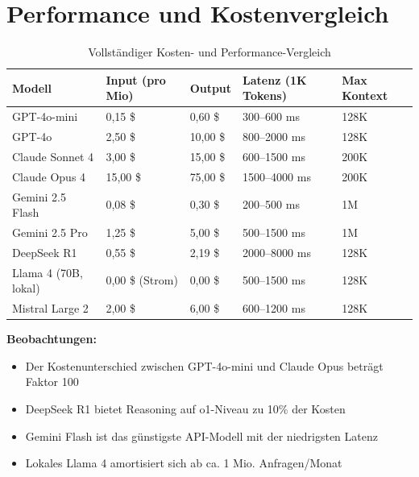 \section{Performance und Kostenvergleich}

\begin{table}[H]
\centering
\begin{tabularx}{\linewidth}{lXXXX}
\toprule
\textbf{Modell} & \textbf{Input (pro Mio)} & \textbf{Output} & \textbf{Latenz (1K Tokens)} & \textbf{Max Kontext} \\
\midrule
GPT-4o-mini & 0,15 \$ & 0,60 \$ & 300--600 ms & 128K \\
GPT-4o & 2,50 \$ & 10,00 \$ & 800--2000 ms & 128K \\
Claude Sonnet 4 & 3,00 \$ & 15,00 \$ & 600--1500 ms & 200K \\
Claude Opus 4 & 15,00 \$ & 75,00 \$ & 1500--4000 ms & 200K \\
Gemini 2.5 Flash & 0,08 \$ & 0,30 \$ & 200--500 ms & 1M \\
Gemini 2.5 Pro & 1,25 \$ & 5,00 \$ & 500--1500 ms & 1M \\
DeepSeek R1 & 0,55 \$ & 2,19 \$ & 2000--8000 ms & 128K \\
Llama 4 (70B, lokal) & 0,00 \$ (Strom) & 0,00 \$ & 500--1500 ms & 128K \\
Mistral Large 2 & 2,00 \$ & 6,00 \$ & 600--1200 ms & 128K \\
\bottomrule
\end{tabularx}
\caption{Vollständiger Kosten- und Performance-Vergleich}
\label{tab:vollvergleich}
\end{table}

\textbf{Beobachtungen:}
\begin{itemize}[leftmargin=*]
    \item Der Kostenunterschied zwischen GPT-4o-mini und Claude Opus beträgt Faktor 100
    \item DeepSeek R1 bietet Reasoning auf o1-Niveau zu 10\% der Kosten
    \item Gemini Flash ist das günstigste API-Modell mit der niedrigsten Latenz
    \item Lokales Llama 4 amortisiert sich ab ca. 1 Mio. Anfragen/Monat
\end{itemize}

